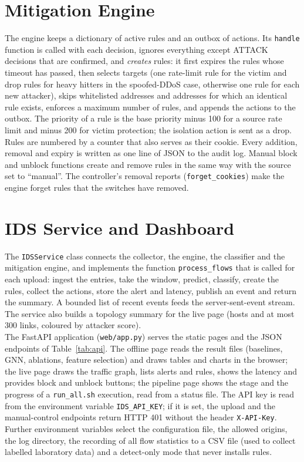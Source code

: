 \section{Mitigation Engine}
The engine keeps a dictionary of active rules and an outbox of actions. Its \texttt{handle} function is called with each decision, ignores everything except ATTACK decisions that are confirmed, and \emph{creates} rules: it first expires the rules whose timeout has passed, then selects targets (one rate-limit rule for the victim and drop rules for heavy hitters in the spoofed-DDoS case, otherwise one rule for each new attacker), skips whitelisted addresses and addresses for which an identical rule exists, enforces a maximum number of rules, and appends the actions to the outbox. The priority of a rule is the base priority minus 100 for a source rate limit and minus 200 for victim protection; the isolation action is sent as a drop. Rules are numbered by a counter that also serves as their cookie. Every addition, removal and expiry is written as one line of JSON to the audit log. Manual block and unblock functions create and remove rules in the same way with the source set to ``manual''. The controller's removal reports (\texttt{forget\_cookies}) make the engine forget rules that the switches have removed.

\section{IDS Service and Dashboard}
The \texttt{IDSService} class connects the collector, the engine, the classifier and the mitigation engine, and implements the function \texttt{process\_flows} that is called for each upload: ingest the entries, take the window, predict, classify, create the rules, collect the actions, store the alert and latency, publish an event and return the summary. A bounded list of recent events feeds the server-sent-event stream. The service also builds a topology summary for the live page (hosts and at most 300 links, coloured by attacker score).\\

The FastAPI application (\texttt{web/app.py}) serves the static pages and the JSON endpoints of Table~\ref{tab:api}. The offline page reads the result files (baselines, GNN, ablations, feature selection) and draws tables and charts in the browser; the live page draws the traffic graph, lists alerts and rules, shows the latency and provides block and unblock buttons; the pipeline page shows the stage and the progress of a \texttt{run\_all.sh} execution, read from a status file. The API key is read from the environment variable \texttt{IDS\_API\_KEY}; if it is set, the upload and the manual-control endpoints return HTTP 401 without the header \texttt{X-API-Key}. Further environment variables select the configuration file, the allowed origins, the log directory, the recording of all flow statistics to a CSV file (used to collect labelled laboratory data) and a detect-only mode that never installs rules.

